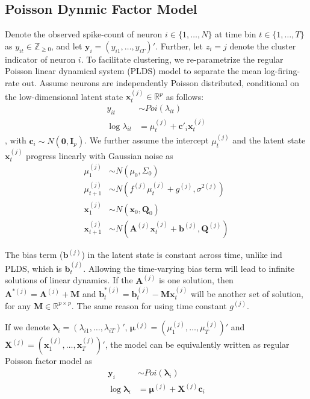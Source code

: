 \documentclass{article}
\begin{document}
	\subsection{Poisson Dynmic Factor Model}
	Denote the observed spike-count of neuron $i \in \{ 1,\ldots,N\}$ at
	time bin $t \in \{ 1,\ldots,T\}$ as
	$y_{it} \in \mathbb{Z}_{\geq 0}$, and let
	$\bm{y}_{i} =  (y_{i1},\ldots,y_{iT})'$.
	Further, let $z_{i} = j$ denote the cluster indicator of neuron $i$. To facilitate clustering, we re-parametrize the regular Poisson linear dynamical system (PLDS) model \citep{Macke2011} to separate the mean log-firing-rate out. Assume neurons are independently Poisson distributed, conditional on the
	low-dimensional latent state $\bm{x}_{t}^{(j)} \in \mathbb{R}^{p}$ as follows:
	\begin{align*}
		y_{it} &\sim Poi(\lambda_{it})\\
		\log\lambda_{it} &= \mu_t^{(j)} + \bm{c}'_i\bm{x}^{(j)}_t
	\end{align*}
	, with $\bm{c}_i\sim N(\bm{0},\bm{I}_p)$. We further assume the intercept $\mu_t^{(j)}$ and the latent state $\bm{x}^{(j)}_t$ progress linearly with Gaussian noise as
	\begin{align*}
		\mu_1^{(j)} &\sim N(\mu_0, \Sigma_0)\\
		\mu_{t+1}^{(j)} &\sim N(f^{(j)}\mu_t^{(j)} + g^{(j)}, \sigma^{2(j)})\\
		\bm{x}_1^{(j)} &\sim N(\bm{x}_0, \bm{Q}_0)\\
		\bm{x}_{t+1}^{(j)} &\sim N(\bm{A}^{(j)}\bm{x}_t^{(j)} + \bm{b}^{(j)}, \bm{Q}^{(j)})
	\end{align*}
	
	The bias term ($\bm{b}^{(j)}$) in the latent state is constant across time, unlike ind PLDS, which is  $\bm{b}_t^{(j)}$. Allowing the time-varying bias term will lead to infinite solutions of linear dynamics. If the $\bm{A}^{(j)}$ is one solution, then $\bm{A}^{*(j)} = \bm{A}^{(j)} + \bm{M}$ and $\bm{b}_t^{*(j)} = \bm{b}_t^{(j)} - \bm{M}\bm{x}^{(j)}_t$ will be another set of solution, for any $\bm{M} \in \mathbb{R}^{p\times p}$. The same reason for using time constant $g^{(j)}$.
	
	If we denote $\bm{\lambda}_{i} =  (\lambda_{i1},\ldots,\lambda_{iT})'$, $\bm{\mu}^{(j)} = (\mu^{(j)}_1,\ldots,\mu^{(j)}_T)'$ and $\bm{X}^{(j)} = (\bm{x}^{(j)}_1,\ldots,\bm{x}^{(j)}_T)'$, the model can be equivalently written as regular Poisson factor model as
	\begin{align*}
		\bm{y}_i &\sim Poi(\bm{\lambda}_i)\\
		\log\bm{\lambda}_i &= \bm{\mu}^{(j)}+ \bm{X}^{(j)}\bm{c}_i 
	\end{align*}
\end{document}
